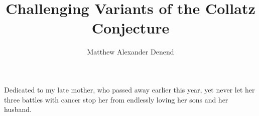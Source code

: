 \documentclass[12pt]{report}	%
\author{Matthew Alexander Denend}  	%
\title{Challenging Variants of the Collatz Conjecture}
\begin{document}
\copyrightpage          %


%
%
%
\commcertpage           %

\titlepage              %



%
\begin{dedication}
%
Dedicated to my late mother, who passed away earlier this year, yet never
let her three battles with cancer stop her from endlessly loving her sons and
her husband.
\end{dedication}
\end{document}
